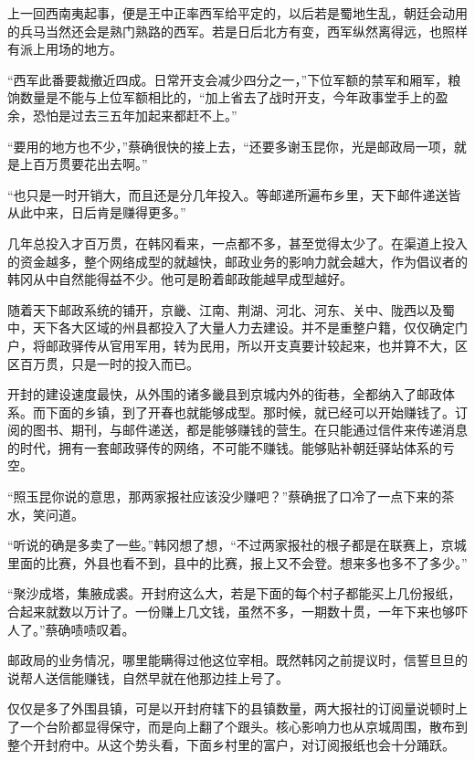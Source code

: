 上一回西南夷起事，便是王中正率西军给平定的，以后若是蜀地生乱，朝廷会动用的兵马当然还会是熟门熟路的西军。若是日后北方有变，西军纵然离得远，也照样有派上用场的地方。

“西军此番要裁撤近四成。日常开支会减少四分之一，”下位军额的禁军和厢军，粮饷数量是不能与上位军额相比的，“加上省去了战时开支，今年政事堂手上的盈余，恐怕是过去三五年加起来都赶不上。”

“要用的地方也不少，”蔡确很快的接上去，“还要多谢玉昆你，光是邮政局一项，就是上百万贯要花出去啊。”

“也只是一时开销大，而且还是分几年投入。等邮递所遍布乡里，天下邮件递送皆从此中来，日后肯是赚得更多。”

几年总投入才百万贯，在韩冈看来，一点都不多，甚至觉得太少了。在渠道上投入的资金越多，整个网络成型的就越快，邮政业务的影响力就会越大，作为倡议者的韩冈从中自然能得益不少。他可是盼着邮政能越早成型越好。

随着天下邮政系统的铺开，京畿、江南、荆湖、河北、河东、关中、陇西以及蜀中，天下各大区域的州县都投入了大量人力去建设。并不是重整户籍，仅仅确定门户，将邮政驿传从官用军用，转为民用，所以开支真要计较起来，也并算不大，区区百万贯，只是一时的投入而已。

开封的建设速度最快，从外围的诸多畿县到京城内外的街巷，全都纳入了邮政体系。而下面的乡镇，到了开春也就能够成型。那时候，就已经可以开始赚钱了。订阅的图书、期刊，与邮件递送，都是能够赚钱的营生。在只能通过信件来传递消息的时代，拥有一套邮政驿传的网络，不可能不赚钱。能够贴补朝廷驿站体系的亏空。

“照玉昆你说的意思，那两家报社应该没少赚吧？”蔡确抿了口冷了一点下来的茶水，笑问道。

“听说的确是多卖了一些。”韩冈想了想，“不过两家报社的根子都是在联赛上，京城里面的比赛，外县也看不到，县中的比赛，报上又不会登。想来多也多不了多少。”

“聚沙成塔，集腋成裘。开封府这么大，若是下面的每个村子都能买上几份报纸，合起来就数以万计了。一份赚上几文钱，虽然不多，一期数十贯，一年下来也够吓人了。”蔡确啧啧叹着。

邮政局的业务情况，哪里能瞒得过他这位宰相。既然韩冈之前提议时，信誓旦旦的说帮人送信能赚钱，自然早就在他那边挂上号了。

仅仅是多了外围县镇，可是以开封府辖下的县镇数量，两大报社的订阅量说顿时上了一个台阶都显得保守，而是向上翻了个跟头。核心影响力也从京城周围，散布到整个开封府中。从这个势头看，下面乡村里的富户，对订阅报纸也会十分踊跃。

